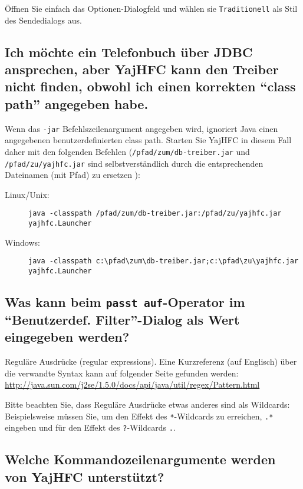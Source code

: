 \documentclass[a4paper,10pt,halfparskip,noparindent]{scrartcl}
\begin{document}
Öffnen Sie einfach das Optionen-Dialogfeld und wählen sie \texttt{Traditionell} als Stil des Sendedialogs aus.

\subsection{Ich möchte ein Telefonbuch über JDBC ansprechen, aber YajHFC kann den Treiber nicht finden, obwohl 
ich einen korrekten "`class path"' angegeben habe.}

Wenn das \texttt{-jar} Befehlszeilenargument angegeben wird, ignoriert Java einen angegebenen benutzerdefinierten
class path.
Starten Sie YajHFC in diesem Fall daher mit den folgenden Befehlen (\texttt{/pfad/zum/db-treiber.jar} und \texttt{/pfad/zu/yajhfc.jar} sind selbstverständlich durch die entsprechenden Dateinamen (mit Pfad) zu ersetzen ):
\begin{description}
\item [Linux/Unix:] \verb#java -classpath /pfad/zum/db-treiber.jar:/pfad/zu/yajhfc.jar yajhfc.Launcher#
\item [Windows:] \verb#java -classpath c:\pfad\zum\db-treiber.jar;c:\pfad\zu\yajhfc.jar yajhfc.Launcher#
\end{description}

\subsection{Was kann beim \texttt{passt auf}-Operator im "`Benutzerdef. Filter"'-Dialog als Wert eingegeben werden?}

Reguläre Ausdrücke (regular expressions). Eine Kurzreferenz (auf Englisch) über die verwandte Syntax 
kann auf folgender Seite gefunden werden: 
\url{http://java.sun.com/j2se/1.5.0/docs/api/java/util/regex/Pattern.html}

Bitte beachten Sie, dass Reguläre Ausdrücke etwas anderes sind als Wildcards: 
Beispielsweise müssen Sie, um den Effekt des \verb.*.-Wildcards zu erreichen, \verb#.*# eingeben und 
für den Effekt des \verb#?#-Wildcards \verb#.#.

\subsection{Welche Kommandozeilenargumente werden von YajHFC unterstützt?}
\end{document}
